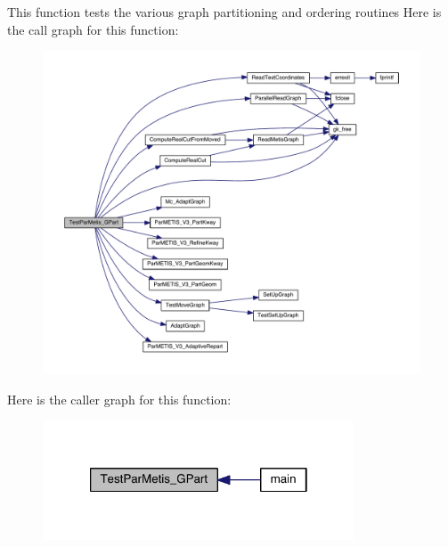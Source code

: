 This function tests the various graph partitioning and ordering routines Here is the call graph for this function\+:\nopagebreak
\begin{figure}[H]
\begin{center}
\leavevmode
\includegraphics[width=350pt]{a00437_adb0c2dc0c5138f35c71739328c702074_cgraph}
\end{center}
\end{figure}
Here is the caller graph for this function\+:\nopagebreak
\begin{figure}[H]
\begin{center}
\leavevmode
\includegraphics[width=262pt]{a00437_adb0c2dc0c5138f35c71739328c702074_icgraph}
\end{center}
\end{figure}
\mbox{\label{a00437_aff9e935a0b03f0424e9c241573bb437b}} 
